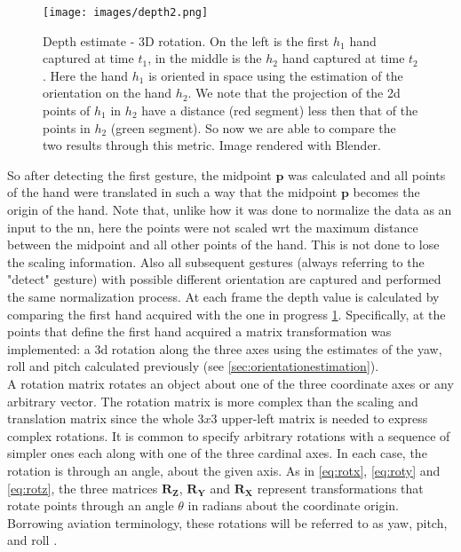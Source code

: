 \begin{figure}[H]
	\centering
	\texttt{[image: images/depth2.png]}
	\caption[Depth estimate - 3D rotation.]{Depth estimate - 3D rotation. On the left is the first $h_1$ hand captured at time $t_1$, in the middle is the $h_2$ hand captured at time $t_2$. Here the hand $h_1$ is oriented in space using the estimation of the orientation on the hand $h_2$. We note that the projection of the \gls{2d} points of $h_1$ in $h_2$ have a distance (red segment) less then that of the points in $h_2$ (green segment). So now we are able to compare the two results through this metric. Image rendered with Blender.}
	\label{fig:3dorientdepth}
\end{figure}

\noindent So after detecting the first gesture, the midpoint $\bm{p}$ was calculated and all points of the hand were translated in such a way that the midpoint $\bm{p}$ becomes the origin of the hand. Note that, unlike how it was done to normalize the data as an input to the \gls{nn}, here the points were not scaled \gls{wrt} the maximum distance between the midpoint and all other points of the hand. This is not done to lose the scaling information. Also all subsequent gestures (always referring to the "detect" gesture) with possible different orientation are captured and performed the same normalization process. At each frame the depth value is calculated by comparing the first hand acquired with the one in progress \ref{fig:3dorientdepth}. Specifically, at the points that define the first hand acquired a matrix transformation was implemented: a \gls{3d} rotation along the three axes using the estimates of the yaw, roll and pitch calculated previously (see \ref{sec:orientationestimation}). \\

\noindent A rotation matrix rotates an object about one of the three coordinate axes or any arbitrary vector. The rotation matrix is more complex than the scaling and translation matrix since the whole $3x3$ upper-left matrix is needed to express complex rotations. It is common to specify arbitrary rotations with a sequence of simpler ones each along with one of the three cardinal axes. In each case, the rotation is through an angle, about the given axis. As in \ref{eq:rotx}, \ref{eq:roty} and \ref{eq:rotz}, the three matrices $\bm{R_Z}$, $\bm{R_Y}$ and $\bm{R_X}$ represent transformations that rotate points through an angle $\theta$ in radians about the coordinate origin. Borrowing aviation terminology, these rotations will be referred to as yaw, pitch, and roll \cite[]{Yawpitch48:online}.

